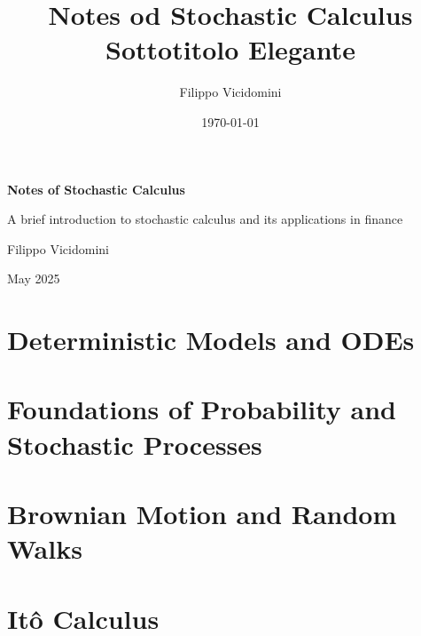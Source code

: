 \documentclass[a5paper]{book}
\title{\Huge\textbf{Notes od Stochastic Calculus}\\\Large Sottotitolo Elegante}
\author{Filippo Vicidomini}
\date{\today}
\begin{document}
\begin{titlepage}
    \centering
    \vspace*{3cm}
    {\Huge\bfseries Notes of Stochastic Calculus\par}
    \vspace{0.5cm}
    {\Large A brief introduction to stochastic calculus and its applications in finance\par}
    \vspace{2cm}
    {\large Filippo Vicidomini\par}
    \vfill
    {\large May 2025\par}
\end{titlepage}

\tableofcontents
\newpage

\chapter{Deterministic Models and ODEs}








\chapter{Foundations of Probability and Stochastic Processes}



\chapter{Brownian Motion and Random Walks}





\chapter{Itô Calculus}









\end{document}
